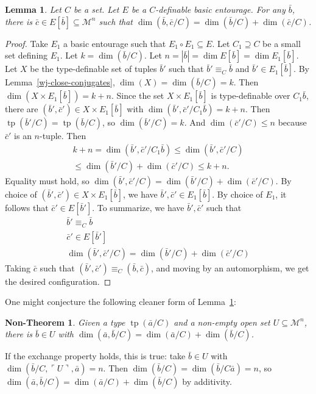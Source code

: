 \documentclass{amsart}
\newtheorem{nontheorem}[theorem]{Non-Theorem}
\newtheorem{lemma}[theorem]{Lemma}
\theoremstyle{definition}
\newcommand{\tp}{\operatorname{tp}}
\begin{document}
\begin{lemma} \label{wj-strange}
  Let $C$ be a set.  Let $E$ be a $C$-definable basic entourage.  For
  any $\bar{b}$, there is $\bar{c} \in E[\bar{b}] \subseteq \mathcal{M}^n$ such that
  $\dim(\bar{b},\bar{c}/C) = \dim(\bar{b}/C) + \dim(\bar{c}/C)$.
\end{lemma}
\begin{proof}
  Take $E_1$ a basic entourage such that $E_1 \circ E_1 \subseteq E$.
  Let $C_1 \supseteq C$ be a small set defining $E_1$.  Let $k =
  \dim(\bar{b}/C)$.  Let $n = |\bar{b}| = \dim E[\bar{b}] = \dim E_1[\bar{b}]$.
  Let $X$ be the type-definable set of tuples $\bar{b}'$ such that
  $\bar{b}' \equiv_C \bar{b}$ and $\bar{b}' \in E_1[\bar{b}]$.  By
  Lemma~\ref{wj-close-conjugates}, $\dim(X) = \dim(\bar{b}/C) = k$.  Then
  $\dim(X \times E_1[\bar{b}]) = k + n$.  Since the set $X \times
  E_1[\bar{b}]$ is type-definable over $C_1\bar{b}$, there are
  $(\bar{b}',\bar{c}') \in X \times E_1[\bar{b}]$ with
  $\dim(\bar{b}',\bar{c}'/C_1\bar{b}) = k + n$.  Then $\tp(\bar{b}'/C) =
  \tp(\bar{b}/C)$, so $\dim(\bar{b}'/C) = k$.  And $\dim(\bar{c}'/C) \le
  n$ because $\bar{c}'$ is an $n$-tuple.  Then
  \begin{gather*}
    k + n = \dim(\bar{b}',\bar{c}'/C_1\bar{b}) \le \dim(\bar{b}',\bar{c}'/C) \\
    \le \dim(\bar{b}'/C) + \dim(\bar{c}'/C) \le k + n.
  \end{gather*}
  Equality must hold, so $\dim(\bar{b}',\bar{c}'/C) = \dim(\bar{b}'/C) +
  \dim(\bar{c}'/C)$.  By choice of $(\bar{b}',\bar{c}') \in X \times
  E_1[\bar{b}]$, we have $\bar{b}', \bar{c}' \in E_1[\bar{b}]$.  By choice of $E_1$,
  it follows that $\bar{c}' \in E[\bar{b}']$.  To summarize,
  we have $
  \bar{b}', \bar{c}'$ such that
  \begin{gather*}
    \bar{b}' \equiv_C \bar{b} \\ \bar{c}' \in E[\bar{b}']
    \\ \dim(\bar{b}',\bar{c}'/C) = \dim(\bar{b}'/C) + \dim(\bar{c}'/C)
  \end{gather*}
  Taking $\bar{c}$ such that $(\bar{b}',\bar{c}') \equiv_C (\bar{b},\bar{c})$,
  and moving by an automorphism, we get the desired configuration.
\end{proof}
One might conjecture the following cleaner form of
Lemma~\ref{wj-strange}:
\begin{nontheorem}\label{wj-nontheorem}
  Given a type $\tp(\bar{a}/C)$ and a non-empty open set $U \subseteq
  \mathcal{M}^n$, there is $\bar{b} \in U$ with $\dim(\bar{a},\bar{b}/C) = \dim(\bar{a}/C) +
  \dim(\bar{b}/C)$.
\end{nontheorem}
If the exchange property holds, this is true: take $\bar{b} \in U$ with
$\dim(\bar{b}/C, \ulcorner U \urcorner ,\bar{a}) = n$.  Then $\dim(\bar{b}/C) =
\dim(\bar{b}/C\bar{a}) = n$, so $\dim(\bar{a},\bar{b}/C) = \dim(\bar{a}/C) + \dim(\bar{b}/C)$
by additivity.
\end{document}
